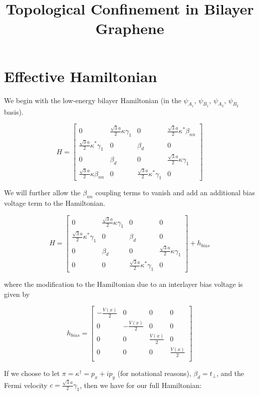 \documentclass{article}
\title{Topological Confinement in Bilayer Graphene}
\begin{document}
\section{Effective Hamiltonian}
We begin with the low-energy bilayer Hamiltonian (in the $\psi_{A_{1}}$, $\psi_{B_{1}}$, $\psi_{A_{2}}$, $\psi_{B_{2}}$ basis).

\begin{equation}
H =
\begin{bmatrix}
0 & \frac{\sqrt{3}a}{2}\kappa\gamma_{1} & 0 & \frac{\sqrt{3}a}{2}\kappa^{*}\beta_{nn}\\
\frac{\sqrt{3}a}{2}\kappa^{*}\gamma_{1} & 0 & \beta_{d} & 0 \\
0 & \beta_{d} & 0  & \frac{\sqrt{3}a}{2}\kappa\gamma_{1} \\
\frac{\sqrt{3}a}{2}\kappa\beta_{nn} & 0 & \frac{\sqrt{3}a}{2}\kappa^{*}\gamma_{1}& 0
\end{bmatrix}
\end{equation}

We will further allow the $\beta_{nn}$ coupling terms to vanish and add an additional bias voltage term to the Hamiltonian.

\begin{equation}
H =
\begin{bmatrix}
0 & \frac{\sqrt{3}a}{2}\kappa\gamma_{1} & 0 & 0\\
\frac{\sqrt{3}a}{2}\kappa^{*}\gamma_{1} & 0 & \beta_{d} & 0 \\
0 & \beta_{d} & 0  & \frac{\sqrt{3}a}{2}\kappa\gamma_{1} \\
0 & 0 & \frac{\sqrt{3}a}{2}\kappa^{*}\gamma_{1}& 0
\end{bmatrix}
 + h_{bias}
\end{equation}

where the modification to the Hamiltonian due to an interlayer bias voltage is given by

\begin{equation}
h_{bias} =
\begin{bmatrix}
-\frac{V(x)}{2} & 0 & 0 & 0\\
0& -\frac{V(x)}{2} & 0 & 0 \\
0 & 0 & \frac{V(x)}{2} & 0 \\
0 & 0 &  0 & \frac{V(x)}{2} \\
\end{bmatrix}
\end{equation}

If we choose to let $\pi = \kappa^{\dagger} = p_{x} + ip_{y}$ (for notational reasons), $\beta_{d} = t_{\perp}$, and the Fermi
velocity $c = \frac{\sqrt{3}a}{2}\gamma_{1}$, then we have for our full Hamiltonian:
\end{document}
